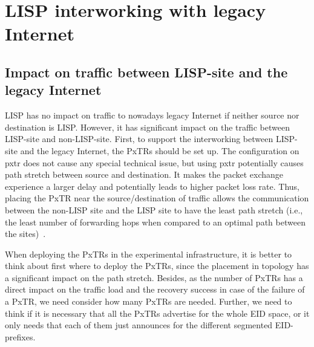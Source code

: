 \section{LISP interworking with legacy Internet}
\label{sec:interworking}

\subsection{Impact on traffic between LISP-site and the legacy Internet}
\label{subsec:interworking_impact}
LISP has no impact on traffic to nowadays legacy Internet if neither source nor destination is LISP. However, it has significant impact on the traffic between LISP-site and non-LISP-site. First, to support the interworking between LISP-site and the legacy Internet, the PxTRs should be set up. The configuration on \acrshort{pxtr} does not cause any special technical issue, but using \acrshort{pxtr} potentially causes path stretch between source and destination. It makes the packet exchange experience a larger delay and potentially leads to higher packet loss rate. Thus, placing the PxTR near the source/destination of traffic allows the communication between the non-LISP site and the LISP site to have the least path stretch (i.e., the least number of forwarding hops when compared to an optimal path between the sites)~\cite{rfc6832}. %

When deploying the PxTRs in the experimental infrastructure, it is better to think about first where to deploy the PxTRs, since the placement in topology has a significant impact on the path stretch. Besides, as the number of PxTRs has a direct impact on the traffic load and the recovery success in case of the failure of a PxTR, we need consider how many PxTRs are needed. Further, we need to think if it is necessary that all the PxTRs advertise for the whole EID space, or it only needs that each of them just announces for the different segmented EID-prefixes.

